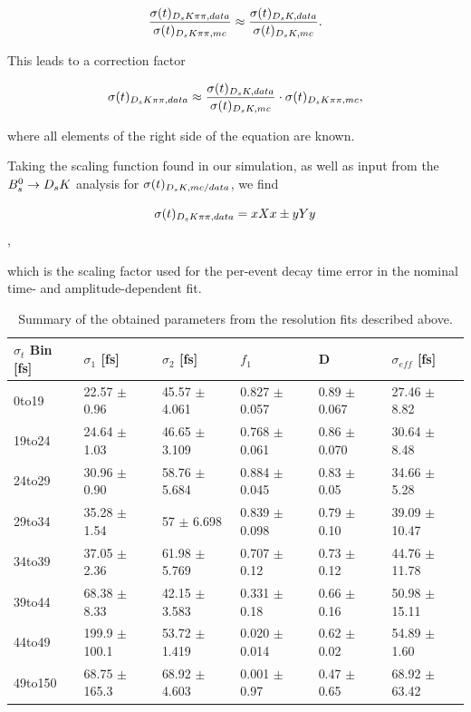 \begin{equation}
\frac{\sigma(t)_{{{D}_{s}}{K}{\pi}{\pi},data}}{\sigma(t)_{{{D}_{s}}{K}{\pi}{\pi},mc}} \approx  \frac{\sigma(t)_{{{D}_{s}}{K},data}}{\sigma(t)_{{{D}_{s}}{K},mc}}.
\label{eq:resoMCvsData}
\end{equation}

This leads to a correction factor 

\begin{equation}
\sigma(t)_{{{D}_{s}}{K}{\pi}{\pi},data} \approx  \frac{\sigma(t)_{{{D}_{s}}{K},data}}{\sigma(t)_{{{D}_{s}}{K},mc}} \cdot \sigma(t)_{{{D}_{s}}{K}{\pi}{\pi},mc},
\label{eq:resoMCvsData_2}
\end{equation}

where all elements of the right side of the equation are known. \newline

Taking the scaling function found in our simulation, as well as input from the ${{B}^0_{s}}\rightarrow{\ensuremath{{D}_{s}}}{\ensuremath{K}}$ analysis for $\sigma(t)_{{{D}_{s}}{K},mc/data}$, we find

\[\sigma(t)_{{{D}_{s}}{K}{\pi}{\pi},data} = xXx \pm yYy\],

which is the scaling factor used for the per-event decay time error in the nominal time- and amplitude-dependent fit. 


\begin{table}[h]
\centering
 \begin{tabular}{l || l l l | l l}
$\sigma_{t}$ Bin [fs] & $\sigma_{1}$ [fs] & $\sigma_{2}$ [fs] & $f_{1}$ & D & $\sigma_{eff}$ [fs] \\
\hline
0to19 & 22.57 $\pm$ 0.96 & 45.57 $\pm$ 4.061 & 0.827 $\pm$ 0.057 & 0.89 $\pm$ 0.067 & 27.46 $\pm$ 8.82 \\
19to24 & 24.64 $\pm$ 1.03 & 46.65 $\pm$ 3.109 & 0.768 $\pm$ 0.061 & 0.86 $\pm$ 0.070 & 30.64 $\pm$ 8.48 \\
24to29 & 30.96 $\pm$ 0.90 & 58.76 $\pm$ 5.684 & 0.884 $\pm$ 0.045 & 0.83 $\pm$ 0.05 & 34.66 $\pm$ 5.28 \\
29to34 & 35.28 $\pm$ 1.54 & 57 $\pm$ 6.698 & 0.839 $\pm$ 0.098 & 0.79 $\pm$ 0.10 & 39.09 $\pm$ 10.47 \\
34to39 & 37.05 $\pm$ 2.36 & 61.98 $\pm$ 5.769 & 0.707 $\pm$ 0.12 & 0.73 $\pm$ 0.12 & 44.76 $\pm$ 11.78 \\
39to44 & 68.38 $\pm$ 8.33 & 42.15 $\pm$ 3.583 & 0.331 $\pm$ 0.18 & 0.66 $\pm$ 0.16 & 50.98 $\pm$ 15.11 \\
44to49 & 199.9 $\pm$ 100.1 & 53.72 $\pm$ 1.419 & 0.020 $\pm$ 0.014 & 0.62 $\pm$ 0.02 & 54.89 $\pm$ 1.60 \\
49to150 & 68.75 $\pm$ 165.3 & 68.92 $\pm$ 4.603 & 0.001 $\pm$ 0.97 & 0.47 $\pm$ 0.65 & 68.92 $\pm$ 63.42 \\
\hline
\end{tabular}
\caption{Summary of the obtained parameters from the resolution fits described above.}
\label{table:ResoParams}
\end{table}


